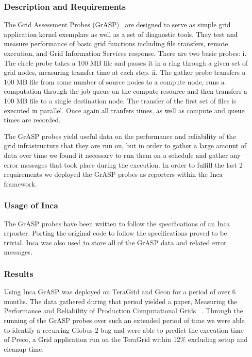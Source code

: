 \documentclass[times,10pt,twocolumn]{article}
\begin{document}
\label{grasp}

\subsubsection{Description and Requirements}

The Grid Assessment Probes (GrASP)~\cite{grasp} are designed to 
serve as simple grid application kernel exemplars as well as a 
set of diagnostic tools. They test and measure performance of 
basic grid functions including file transfers, remote execution, 
and Grid Information Services response.  There are two basic probes: i.  The
circle probe takes a 100 MB file and passes it in a ring through a given set
of grid nodes, measuring transfer time at each step.  ii.  The gather probe
transfers a 100 MB file from some number of source nodes to a compute node,
runs a computation through the job queue on the compute resource and then
transfers a 100 MB file to a single destination node.  The transfer of the
first set of files is executed in parallel.  Once again all tranfers times, as
well as compute and queue times are recorded.

The GrASP probes yield useful data on the performance and reliability of the
grid infrastructure that they are run on, but in order to gather a large
amount of data over time we found it necessary to run them on a schedule and
gather any error messages that took place during the execution.  In order to
fulfill the last 2 requirements we deployed the GrASP probes as reporters
within the Inca framework.

\subsubsection{Usage of Inca}

The GrASP probes have been written to follow the specifications of an Inca
reporter.  Porting the original code to follow the specifications proved to be
trivial.  Inca was also used to store all of the GrASP data and related error
messages. 


\subsubsection{Results}

Using Inca GrASP was deployed on TeraGrid and Geon for a period of over 6
months.  The data gathered during that period yielded a paper, Measuring the
Performance and Reliability of Production Computational Grids ~\cite{grasp2}.
Through the running of the GrASP probes over such an extended period of time
we were able to identify a recurring Globus 2 bug and were able to predict the
execution time of Preco, a Grid application run on the TeraGrid within 12\%
excluding setup and cleanup time.
\end{document}
